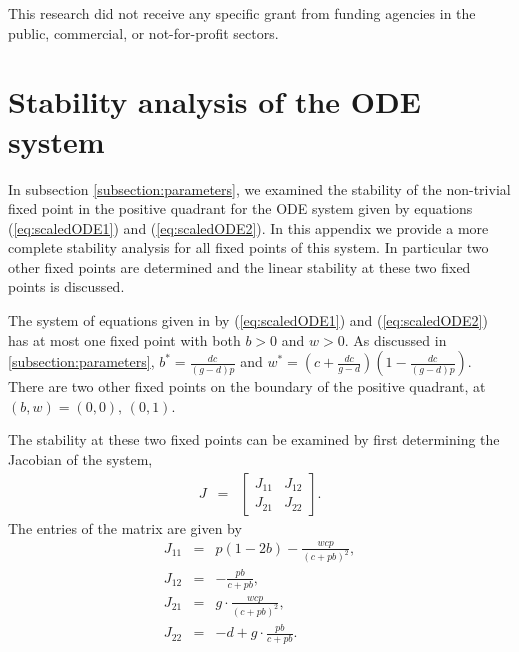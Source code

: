 \documentclass[review,authoryear]{elsarticle}
\begin{document}

\vfill

This research did not receive any specific grant from funding agencies in the public, commercial, or not-for-profit sectors.

\clearpage

\appendix

\section{Stability analysis of the ODE system}
\label{appendix:otherFixedPoints}

In subsection \ref{subsection:parameters}, we examined the stability of the
non-trivial fixed point in the positive quadrant for the ODE system given by equations (\ref{eq:scaledODE1}) and
(\ref{eq:scaledODE2}). In this appendix we provide a more complete stability analysis for all fixed points of this system.  In particular  two other
fixed points are determined and the linear
stability at these two fixed points is discussed.

The  system of equations given in by
(\ref{eq:scaledODE1}) and (\ref{eq:scaledODE2}) has at most one fixed point
with both $b>0$ and $w>0$.  As discussed in \ref{subsection:parameters}, $b^*= \frac{dc}{(g-d)p}$ and $w^* = (c+\frac{dc}{g-d})(1- \frac{dc}{(g-d)p}).$  There are two other fixed points on the boundary of the positive quadrant, at $(b,w)=(0,0), \,(0,1)$. 
  

The stability at these two fixed points can be examined by first
determining the Jacobian of the system,
\begin{eqnarray*}
  J & = & \left[
          \begin{array}{rr}
            J_{11} & J_{12} \\
            J_{21} & J_{22}
          \end{array}
          \right].
\end{eqnarray*}
The entries of the matrix are given by
\begin{eqnarray*}
  J_{11} & = & p(1-2b) -
               \frac{w  c   p}{\left( c + pb \right)^2}, \\
  J_{12} & = & -\frac{pb}{c+pb}, \\
  J_{21} & = & g \cdot\frac{wcp}{(c+pb)^2}, \\
  J_{22} & = & -d + g  \cdot \frac{pb}{c+pb}.
\end{eqnarray*}
\end{document}
